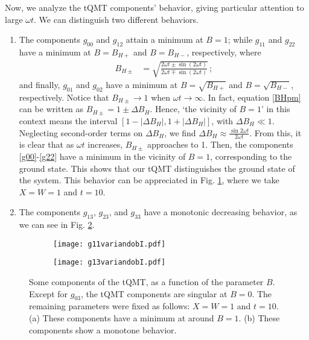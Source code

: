 \documentclass[12pt]{iopart}
\begin{document}
Now, we analyze the tQMT components' behavior, giving particular attention to large $\omega t$.  We can distinguish two different behaviors.

\begin{enumerate}
 \item The components $g_{00}$ and $g_{12}$ attain a minimum at $B=1$; while $g_{11}$ and $g_{22}$ have a minimum at $B=B_{H+}$ and $B=B_{H-}$, respectively, where 
\begin{align} \label{BHpm}
    B_{H\pm}&=\sqrt{\frac{2\omega t \pm \sin\left(2 \omega t\right)} {2 \omega t \mp\sin\left(2 \omega t\right)}}\,;
\end{align}
and finally, $g_{01}$ and $g_{02}$ have a minimum at $B=\sqrt{B_{H+}}$ and $B=\sqrt{B_{H-}}$, respectively. Notice that $B_{H\pm}\to 1$ when $\omega t\to \infty$. In fact, equation \eqref{BHpm} can be written as $B_{H\pm}=1\pm\Delta B_H$.  Hence, `the vicinity of $B=1$' in this context means the interval $[ 1-|\Delta B_H|,1+|\Delta B_H| ]$, with $\Delta B_H\ll 1$. Neglecting second-order terms on $\Delta B_H$, we find $\Delta B_H \approx \tfrac{\sin 2\omega t}{2\omega t}$. From this, it is clear that as $\omega t$ increases, $B_{H\pm}$ approaches to 1. Then, the components \eqref{g00}-\eqref{g22} have a minimum in the vicinity of $B=1$, corresponding to the ground state. This shows that our tQMT distinguishes the ground state of the system.  This behavior can be appreciated in Fig. \ref{fig:gvariandobIa}, where we take $X=W=1$ and $t=10$. 
 \item  The components $g_{13}$, $g_{23}$, and $g_{33}$ have a monotonic decreasing behavior, as we can see in Fig. \ref{fig:gvariandobIb}.
\end{enumerate}



\begin{figure}[H]
  \centering
  \begin{subfigure}{0.45\linewidth}
    \texttt{[image: g11variandobI.pdf]}
    \caption{}
    \label{fig:gvariandobIa}
  \end{subfigure}
  \begin{subfigure}{0.45\linewidth}
    \texttt{[image: g13variandobI.pdf]}
    \caption{}
    \label{fig:gvariandobIb}
  \end{subfigure}
  \captionsetup{font=small} 
  \caption{\justifying Some components of the tQMT, as a function of the parameter $B$. Except for $g_{03}$, the tQMT components are singular at $B=0$. The remaining parameters were fixed as follows: $X=W=1$ and $t=10$. (a) These components have a minimum at around $B=1$. (b) These components show a monotone behavior.}
  \label{fig:gvariandobI}
\end{figure}
\end{document}

